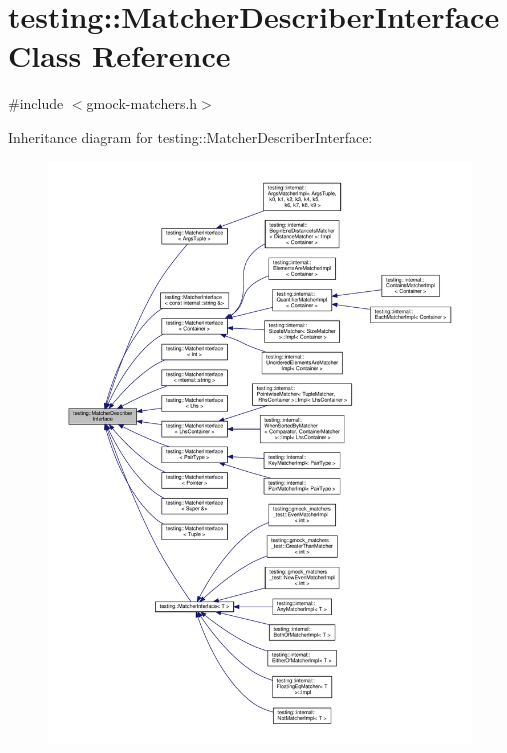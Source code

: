 \hypertarget{classtesting_1_1_matcher_describer_interface}{}\section{testing\+:\+:Matcher\+Describer\+Interface Class Reference}
\label{classtesting_1_1_matcher_describer_interface}


{\ttfamily \#include $<$gmock-\/matchers.\+h$>$}



Inheritance diagram for testing\+:\+:Matcher\+Describer\+Interface\+:
\nopagebreak
\begin{figure}[H]
\begin{center}
\leavevmode
\includegraphics[width=350pt]{classtesting_1_1_matcher_describer_interface__inherit__graph}
\end{center}
\end{figure}

